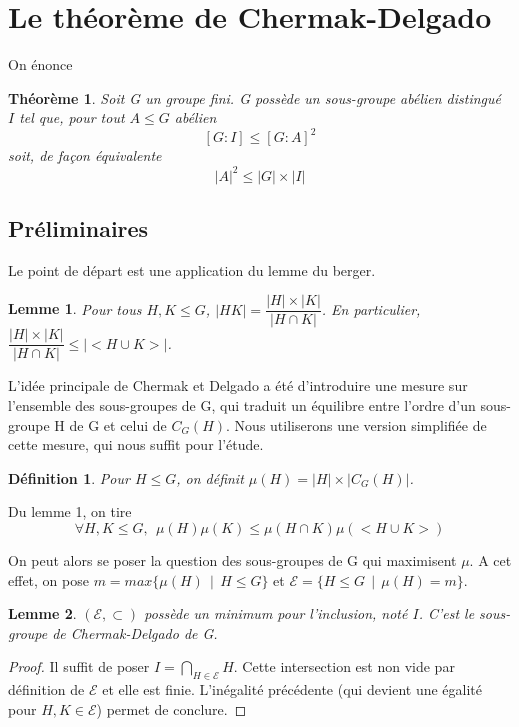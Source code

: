 \documentclass[10pt,a4paper]{article}
\newtheorem{theorem}{Théorème}
\newtheorem{lemma}{Lemme}
\newtheorem{definition}{Définition}
\begin{document}
\section{Le théorème de Chermak-Delgado}
On énonce

\begin{theorem}
    Soit G un groupe fini. G possède un sous-groupe abélien distingué $I$ tel que, pour tout $A \leq G$ abélien $$[G:I] \leq [G:A]^{2}$$ soit, de façon équivalente $$|A|^{2} \leq |G|\times |I|$$
\end{theorem}
\subsection{Préliminaires}
Le point de départ est une application du lemme du berger.
\begin{lemma}
    Pour tous $H,K \leq G$, $|HK| = \dfrac{|H| \times |K|}{|H \cap K|}$.
    \smallbreak
    En particulier,$\dfrac{|H| \times |K|}{|H \cap K|} \leq |<H \cup K>|$.
\end{lemma}
L'idée principale de Chermak et Delgado a été d'introduire une mesure sur l'ensemble des sous-groupes de G, qui traduit un équilibre entre l'ordre d'un sous-groupe H de G et celui de $C_{G}(H)$. Nous utiliserons une version simplifiée de cette mesure, qui nous suffit pour l'étude.
\begin{definition}
    Pour $H \leq G$, on définit $\mu (H) = |H| \times |C_{G}(H)|$.
\end{definition}
Du lemme 1, on tire $$ \forall H,K \leq G,\:\: \mu (H) \mu (K) \leq \mu (H \cap K) \mu (<H \cup K>)$$

On peut alors se poser la question des sous-groupes de G qui maximisent $\mu$. A cet effet, on pose $m=max\{ \mu (H)\:\:|\:\: H \leq G\}$ et $\mathcal{E} = \{ H \leq G \:\:|\:\: \mu (H) = m \}$.
\begin{lemma}
    $(\mathcal{E} , \subset )$ possède un minimum pour l'inclusion, noté $I$. C'est le sous-groupe de Chermak-Delgado de G.
\end{lemma}
\begin{proof}
    Il suffit de poser $I=\bigcap_{H \in \mathcal{E}}H$. Cette intersection est non vide par définition de $\mathcal{E}$ et elle est finie. L'inégalité précédente (qui devient une égalité pour $H,K \in \mathcal{E}$) permet de conclure.
\end{proof}
\end{document}
